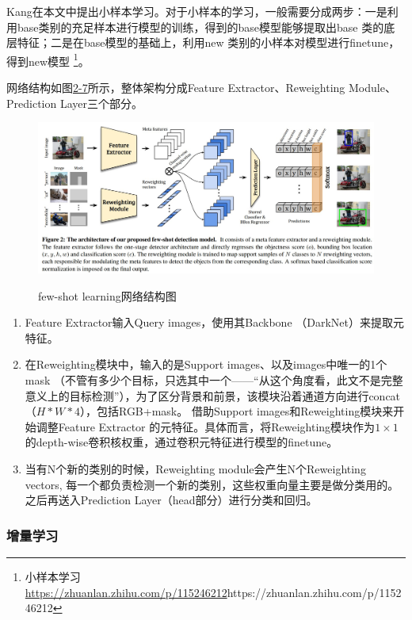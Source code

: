 Kang在本文中\cite{kang2019few}提出小样本学习。对于小样本的学习，一般需要分成两步：一是利用base类别的充足样本进行模型的训练，得到的base模型能够提取出base 类的底层特征；二是在base模型的基础上，利用new 类别的小样本对模型进行finetune，得到new模型
\footnote{小样本学习 \quad \url{https://zhuanlan.zhihu.com/p/115246212}{https://zhuanlan.zhihu.com/p/115246212}}。

网络结构如图\href{fig:2-7}{2-7}所示，整体架构分成Feature Extractor、Reweighting Module、Prediction Layer三个部分。
\begin{figure}
  \centering
  \includegraphics[width=6in]{figure/example/FewShot2.jpg}\\
  \caption{few-shot learning网络结构图}
  \label{fig:2-7}
\end{figure}

\begin{enumerate}
    \item Feature Extractor输入Query images，使用其Backbone （DarkNet）来提取元特征。
    \item 在Reweighting模块中，输入的是Support images、以及images中唯一的1个mask （不管有多少个目标，只选其中一个——“从这个角度看，此文不是完整意义上的目标检测”），为了区分背景和前景，该模块沿着通道方向进行concat（$H*W*4$），包括RGB+mask。 借助Support images和Reweighting模块来开始调整Feature Extractor 的元特征。具体而言，将Reweighting模块作为$1 \times 1$的depth-wise卷积核权重，通过卷积元特征进行模型的finetune。
    \item 当有N个新的类别的时候，Reweighting module会产生N个Reweighting vectors, 每一个都负责检测一个新的类别，这些权重向量主要是做分类用的。之后再送入Prediction Layer（head部分）进行分类和回归。
\end{enumerate}

\subsubsection{增量学习}

